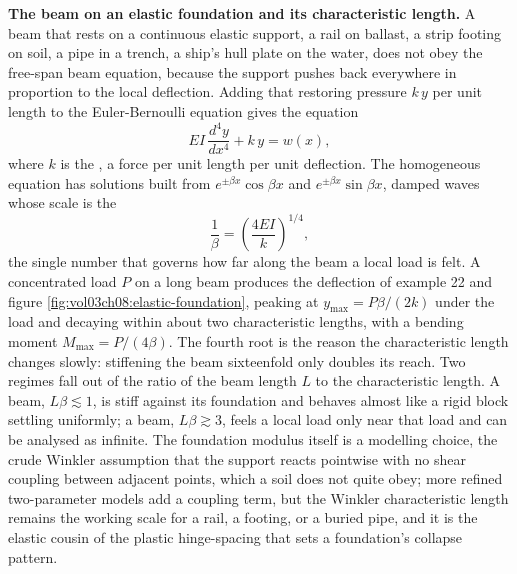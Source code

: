\begin{mastery}
\textbf{The beam on an elastic foundation and its characteristic
length.} A beam that rests on a continuous elastic support, a rail on
ballast, a strip footing on soil, a pipe in a trench, a ship's hull
plate on the water, does not obey the free-span beam equation, because
the support pushes back everywhere in proportion to the local
deflection. Adding that restoring pressure $k\,y$ per unit length to the
Euler-Bernoulli equation gives the 
equation
\[
EI\,\frac{d^4 y}{dx^4} + k\,y = w(x),
\]
where $k$ is the , a force per unit length
per unit deflection. The homogeneous equation has solutions built from
$e^{\pm\beta x}\cos\beta x$ and $e^{\pm\beta x}\sin\beta x$, damped waves
whose scale is the 
\[
\frac{1}{\beta} = \left(\frac{4 EI}{k}\right)^{1/4},
\]
the single number that governs how far along the beam a local load is
felt. A concentrated load $P$ on a long beam produces the deflection of
example 22 and figure \ref{fig:vol03ch08:elastic-foundation}, peaking at
$y_{\max} = P\beta/(2k)$ under the load and decaying within about two
characteristic lengths, with a bending moment $M_{\max} = P/(4\beta)$.
The fourth root is the reason the characteristic length changes slowly:
stiffening the beam sixteenfold only doubles its reach. Two regimes fall
out of the ratio of the beam length $L$ to the characteristic length. A
 beam, $L\beta \lesssim 1$, is stiff against its
foundation and behaves almost like a rigid block settling uniformly; a
 beam, $L\beta \gtrsim 3$, feels a local load only near
that load and can be analysed as infinite. The foundation modulus itself
is a modelling choice, the crude Winkler assumption that the support
reacts pointwise with no shear coupling between adjacent points, which a
soil does not quite obey; more refined two-parameter models add a
coupling term, but the Winkler characteristic length remains the working
scale for a rail, a footing, or a buried pipe, and it is the elastic
cousin of the plastic hinge-spacing that sets a foundation's collapse
pattern.
\end{mastery}

